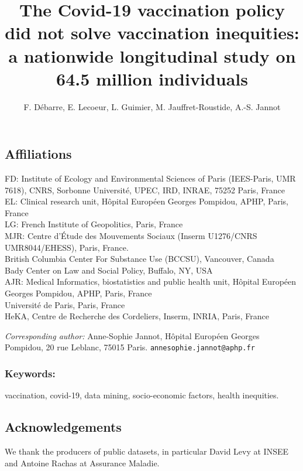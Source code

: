 \documentclass[
]{article}
\title{The Covid-19 vaccination policy did not solve vaccination inequities: a nationwide longitudinal study on 64.5 million individuals}
\author{F. Débarre, E. Lecoeur, L. Guimier, M. Jauffret-Roustide, A.-S. Jannot}
\date{}
\begin{document}
\maketitle

\hypertarget{affiliations}{%
\subsection{Affiliations}\label{affiliations}}

FD: Institute of Ecology and Environmental Sciences of Paris (IEES-Paris, UMR 7618), CNRS, Sorbonne Université, UPEC, IRD, INRAE, 75252 Paris, France\\
EL: Clinical research unit, Hôpital Européen Georges Pompidou, APHP, Paris, France\\
LG: French Institute of Geopolitics, Paris, France\\
MJR: Centre d'Étude des Mouvements Sociaux (Inserm U1276/CNRS UMR8044/EHESS), Paris, France.\\
British Columbia Center For Substance Use (BCCSU), Vancouver, Canada\\
Bady Center on Law and Social Policy, Buffalo, NY, USA\\
AJR: Medical Informatics, biostatistics and public health unit, Hôpital Européen Georges Pompidou, APHP, Paris, France\\
Université de Paris, Paris, France\\
HeKA, Centre de Recherche des Cordeliers, Inserm, INRIA, Paris, France

\emph{Corresponding author:} Anne-Sophie Jannot, Hôpital Européen Georges Pompidou, 20 rue Leblanc, 75015 Paris. \texttt{annesophie.jannot@aphp.fr}

\hypertarget{keywords}{%
\subsubsection{Keywords:}\label{keywords}}

vaccination, covid-19, data mining, socio-economic factors, health inequities.

\hypertarget{acknowledgements}{%
\subsection{Acknowledgements}\label{acknowledgements}}

We thank the producers of public datasets, in particular David Levy at INSEE and Antoine Rachas at Assurance Maladie.
\end{document}

